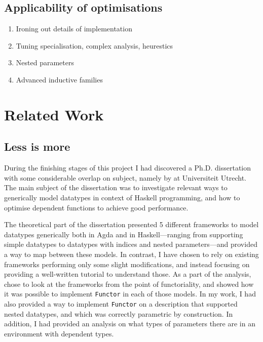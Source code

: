 \documentclass{ituthesis}
\newcommand{\tttype}[1]{\textcolor{type-color}{\texttt{#1}}}
\theoremstyle{break}
\begin{document}
\subsection{Applicability of optimisations}
\label{sub:Applicabilityofoptimisations}

\begin{enumerate}
  \item Ironing out details of implementation
  \item Tuning specialisation, complex analysis, heurestics
  \item Nested parameters
  \item Advanced inductive families
\end{enumerate}


\section{Related Work}
\label{sec:Related Work}
\subsection{Less is more}
\label{sub:Less is more}
During the finishing stages of this project I had discovered a Ph.D. dissertation with some considerable overlap on subject, namely  by \cite{magalhaes2012less} at Universiteit Utrecht.
The main subject of the dissertation was to investigate relevant ways to generically model datatypes in context of Haskell programming, and how to optimise dependent functions to achieve good performance.

The theoretical part of the dissertation presented 5 different frameworks to model datatypes generically both in Agda and in Haskell---ranging from supporting simple datatypes to datatypes with indices and nested parameters---and provided a way to map between these models.
In contrast, I have chosen to rely on existing frameworks performing only some slight modifications, and instead focusing on providing a well-written tutorial to understand those.
As a part of the analysis, \citeauthor{magalhaes2012less} chose to look at the frameworks from the point of functoriality, and showed how it was possible to implement \tttype{Functor} in each of those models.
In my work, I had also provided a way to implement \tttype{Functor} on a description that supported nested datatypes, and which was correctly parametric by construction.
In addition, I had provided an analysis on what types of parameters there are in an environment with dependent types.
\end{document}
